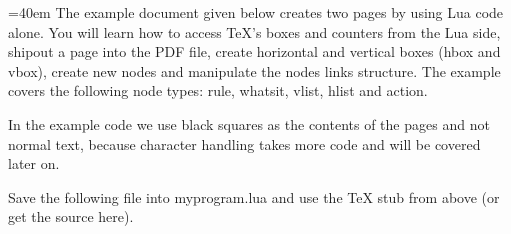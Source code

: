 \documentclass[]{article}
\begin{document}
\hsize=40em
The example document given below creates two pages by using Lua code alone. You will learn how to access TeX's boxes and counters from the Lua side, shipout a page into the PDF file, create horizontal and vertical boxes (hbox and vbox), create new nodes and manipulate the nodes links structure. The example covers the following node types: rule, whatsit, vlist, hlist and action.

In the example code we use black squares as the contents of the pages and not normal text, because character handling takes more code and will be covered later on.

Save the following file into myprogram.lua and use the TeX stub from above (or get the source here). 
\end{document}
